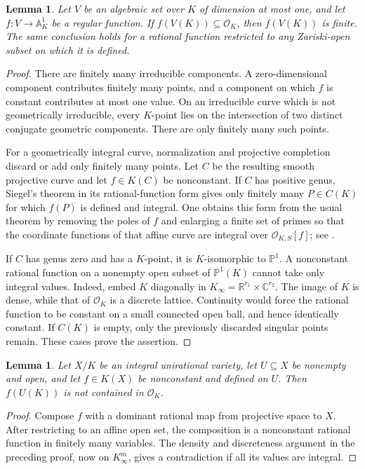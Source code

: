 \documentclass[11pt]{article}
\newtheorem{lemma}[theorem]{Lemma}
\theoremstyle{definition}
\begin{document}
\begin{lemma}\label{p2lb:curves}
Let $V$ be an algebraic set over $K$ of dimension at most one, and let
$f:V\to\mathbb A^1_K$ be a regular function.  If
$f(V(K))\subseteq\mathcal O_K$, then $f(V(K))$ is finite.
The same conclusion holds for a rational function restricted to any
Zariski-open subset on which it is defined.
\end{lemma}
\begin{proof}
There are finitely many irreducible components.  A zero-dimensional
component contributes finitely many points, and a component on which
$f$ is constant contributes at most one value.  On an irreducible curve
which is not geometrically irreducible, every $K$-point lies on the
intersection of two distinct conjugate geometric components.  There
are only finitely many such points.

For a geometrically integral curve, normalization and projective
completion discard or add only finitely many points.  Let $C$ be the
resulting smooth projective curve and let $f\in K(C)$ be nonconstant.
If $C$ has positive genus, Siegel's theorem in its rational-function
form gives only finitely many $P\in C(K)$ for which $f(P)$ is defined
and integral.  One obtains this form from the usual theorem by removing
the poles of $f$ and enlarging a finite set of primes so that the
coordinate functions of that affine curve are integral over
$\mathcal O_{K,S}[f]$; see \cite[Chapter~8]{lbLang1983}.

If $C$ has genus zero and has a $K$-point, it is $K$-isomorphic to
$\mathbb P^1$.  A nonconstant rational function on a nonempty open
subset of $\mathbb P^1(K)$ cannot take only integral values.  Indeed,
embed $K$ diagonally in
$K_\infty=\mathbb R^{r_1}\times\mathbb C^{r_2}$.  The image of $K$
is dense, while that of $\mathcal O_K$ is a discrete lattice.  Continuity
would force the rational function to be constant on a small connected
open ball, and hence identically constant.  If $C(K)$ is empty, only
the previously discarded singular points remain.  These cases prove
the assertion.
\end{proof}

\begin{lemma}\label{p2lb:unirational}
Let $X/K$ be an integral unirational variety, let $U\subseteq X$ be
nonempty and open, and let $f\in K(X)$ be nonconstant and defined on $U$.
Then $f(U(K))$ is not contained in $\mathcal O_K$.
\end{lemma}
\begin{proof}
Compose $f$ with a dominant rational map from projective space to $X$.
After restricting to an affine open set, the composition is a
nonconstant rational function in finitely many variables.  The density
and discreteness argument in the preceding proof, now on
$K_\infty^m$, gives a contradiction if all its values are integral.
\end{proof}
\end{document}
